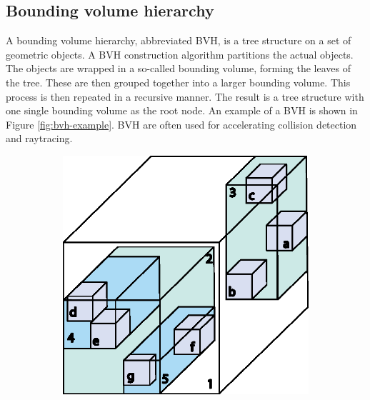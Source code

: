 \subsection{Bounding volume hierarchy }
A bounding volume hierarchy, abbreviated BVH, is a tree structure on a set of geometric objects. A BVH construction algorithm partitions the actual objects. The objects are wrapped in a so-called bounding volume, forming the leaves of the tree. These are then grouped together into a larger bounding volume. This process is then repeated in a recursive manner. The result is a tree structure with one single bounding volume as the root node. An example of a BVH is shown in Figure \ref{fig:bvh-example}. BVH are often used for accelerating collision detection and raytracing.

\begin{figure}[ht]
    \centering
    \begin{subfigure}[c]{0.37\textwidth}
        \vspace{0pt}
        \centering
        \includegraphics[width=\textwidth]{sections/theory/figures/bvh-cube.eps}
    \end{subfigure}
    \hspace{1cm}
    \begin{subfigure}[c]{0.45\textwidth}
        \vspace{0pt}
        \centering

\end{subfigure}
\end{figure}
